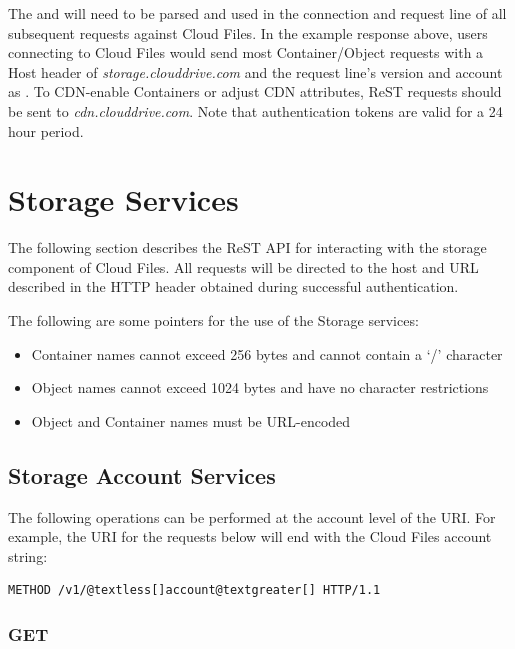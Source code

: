 \documentclass[letterpaper,10pt,english]{manual}
\begin{document}
The  and  will need to be parsed
and used in the connection and request line of all subsequent requests
against Cloud Files. In the example response above, users connecting to
Cloud Files would send most Container/Object requests with a Host header
of \emph{storage.clouddrive.com} and the request line's version and account as
.  To CDN-enable Containers or adjust CDN
attributes, ReST requests should be sent to \emph{cdn.clouddrive.com}. Note
that authentication tokens are valid for a 24 hour period.


\section{Storage Services}

The following section describes the ReST API for interacting with the
storage component of Cloud Files.  All requests will be directed to the
host and URL described in the  HTTP header obtained
during successful authentication.

The following are some pointers for the use of the Storage services:
\begin{itemize}
\item {} 
Container names cannot exceed 256 bytes and cannot contain a `/'
character

\item {} 
Object names cannot exceed 1024 bytes and have no character
restrictions

\item {} 
Object and Container names must be URL-encoded

\end{itemize}


\subsection{Storage Account Services}

The following operations can be performed at the account level of the URI.
For example, the URI for the requests below will end with the Cloud Files
account string:

\begin{Verbatim}[commandchars=@\[\]]
METHOD /v1/@textless[]account@textgreater[] HTTP/1.1
\end{Verbatim}


\subsubsection{GET}
\end{document}

